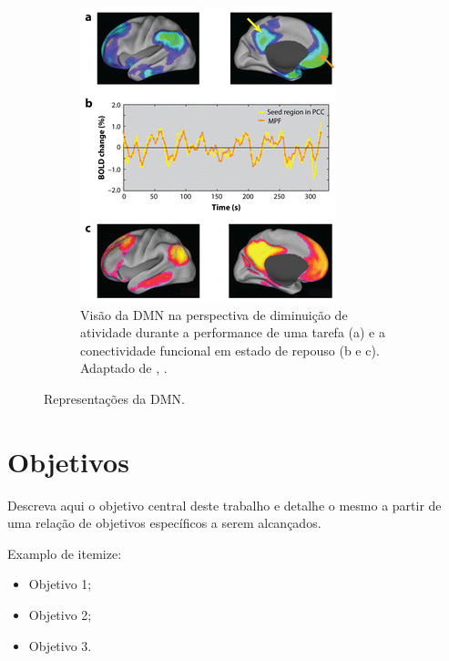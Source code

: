 \documentclass[11pt]{article}
\begin{document}
\begin{figure}[!htb]
\begin{subfigure}[b]{0.4\linewidth}
        \includegraphics[width=\linewidth]{Qualificacao/images/restnet2.png}
        \caption{Visão da DMN na perspectiva de diminuição de atividade durante a performance de uma tarefa (a) e a conectividade funcional em estado de repouso (b e c). Adaptado de \citeauthor{Raichle2015}, \citeyear{Raichle2015}.}
        \label{f:restnet2}
    \end{subfigure}
    \caption{Representações da DMN. }
    \label{f:restnet}
\end{figure}

\section{Objetivos} \label{ch:objetivos}

Descreva aqui o objetivo central deste trabalho e detalhe o mesmo a partir de uma relação de objetivos específicos a serem alcançados.

Examplo de itemize:

\begin{itemize}

\item Objetivo 1;

\item Objetivo 2;

\item Objetivo 3.

\end{itemize}
\end{document}
